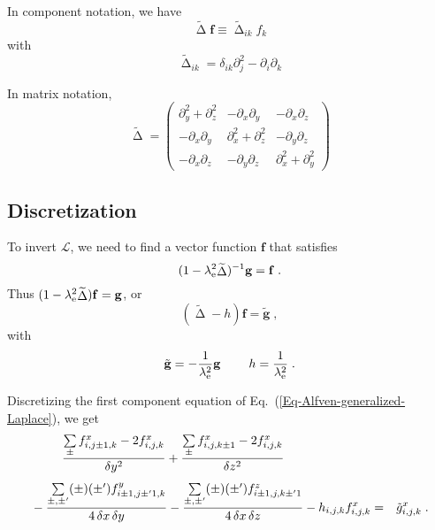 \documentclass[\mydriver,12pt,twoside,notitlepage,letterpaper]{article}
\newcommand{\fv}      {\mathbf{f}}
\newcommand{\gv}      {\mathbf{g}}
\newcommand{\Laplace} { \mathop{\Delta}\nolimits}
\begin{document}
In component notation, we have
\begin{equation}
  \widetilde{\Laplace} \fv
  \equiv \widetilde{\Laplace}_{ik} f_k
\end{equation}
with
\begin{equation}
  \widetilde{\Laplace}_{ik} = \delta_{ik} \partial_j^2
  - \partial_i \partial_k
\end{equation}

In matrix notation,
\begin{equation}
  \widetilde{\Laplace}
  =
  \begin{pmatrix}
    \partial_y^2{+}\partial_z^2 & -\partial_x \partial_y      & -\partial_x \partial_z \\
    -\partial_x \partial_y      & \partial_x^2{+}\partial_z^2 & -\partial_y \partial_z \\
    -\partial_x \partial_z      & -\partial_y \partial_z      & \partial_x^2{+}\partial_y^2
  \end{pmatrix}
\end{equation}


\subsection{Discretization}

To invert $\mathcal{L}$, we need to find a vector function $\fv$ that
satisfies
\begin{equation}
  (1 - \lambda_{\rm e}^2 \widetilde{\Laplace})^{-1} \gv = \fv \; .
\end{equation}
Thus $(1- \lambda_{\rm e}^2 \widetilde{\Laplace}) \fv = \gv$, or
\begin{equation}
  \label{Eq-Alfven-generalized-Laplace}
  (\widetilde{\Laplace} - h) \fv = \tilde{\gv} \; ,
\end{equation}
with
\begin{equation}
  \tilde{\gv} = -\dfrac{1}{\lambda_{\rm e}^2} \gv \; \qquad
  h = \dfrac{1}{\lambda_{\rm e}^2} \; .
\end{equation}

Discretizing the first component equation of
Eq.~(\ref{Eq-Alfven-generalized-Laplace}), we get
\begin{eqnarray}
  \dfrac{\sum\limits_{\pm}
           f^{x}_{i,j\pm1,k} - 2 f^{x}_{i,j,k}}
        {\delta y^2}
  +
  \dfrac{\sum\limits_{\pm}
           f^{x}_{i,j,k\pm1} - 2 f^{x}_{i,j,k}}
        {\delta z^2}
  \hspace*{7em}
  \nonumber \\[1ex]
  {}
  -
  \dfrac{\sum\limits_{\pm,\pm'}
           (\pm) (\pm') f^{y}_{i\pm1,j\pm'1,k}}
        {4\,\delta x\,\delta y}
  -
  \dfrac{\sum\limits_{\pm,\pm'}
           (\pm) (\pm') f^{z}_{i\pm1,j,k\pm'1}}
        {4\,\delta x\,\delta z}
  - h_{i,j,k} f^{x}_{i,j,k}
  &=& \tilde{g}^{x}_{i,j,k} \; . 
\end{eqnarray}
\end{document}
